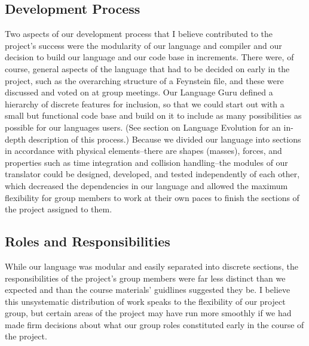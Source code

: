 \subsection{Development Process}
Two aspects of our development process that I believe contributed to
the project's success were the modularity of our language and compiler
and our decision to build our language and our code base in
increments. There were, of course, general aspects of the language
that had to be decided on early in the project, such as the
overarching structure of a Feynstein file, and these were discussed
and voted on at group meetings. Our Language Guru defined a hierarchy
of discrete features for inclusion, so that we could start out with a
small but functional code base and build on it to include as many
possibilities as possible for our languages users. (See section on
Language Evolution for an in-depth description of this process.)
Because we divided our language into sections in accordance with
physical elements--there are shapes (masses), forces, and properties
such as time integration and collision handling--the modules of our
translator could be designed, developed, and tested independently of
each other, which decreased the dependencies in our language and
allowed the maximum flexibility for group members to work at their own
paces to finish the sections of the project assigned to them.

\subsection{Roles and Responsibilities}
While our language was modular and easily separated into discrete sections,
the responsibilities of the project's group members were far less
distinct than we expected and than the course materials' guidlines
suggested they be. I believe this unsystematic distribution of work
speaks to the flexibility of our project group, but certain areas of the
project may have run more smoothly if we had made firm decisions
about what our group roles constituted early in the course of the project.

